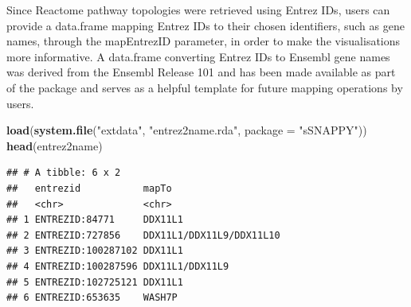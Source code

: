 \documentclass[9pt,a4paper,]{extarticle}
\newenvironment{Shaded}{\begin{snugshade}}{\end{snugshade}}
\newcommand{\AttributeTok}[1]{\textcolor[rgb]{0.13,0.29,0.53}{#1}}
\newcommand{\DecValTok}[1]{\textcolor[rgb]{0.00,0.00,0.81}{#1}}
\newcommand{\FunctionTok}[1]{\textcolor[rgb]{0.13,0.29,0.53}{\textbf{#1}}}
\newcommand{\NormalTok}[1]{#1}
\newcommand{\OtherTok}[1]{\textcolor[rgb]{0.56,0.35,0.01}{#1}}
\newcommand{\SpecialCharTok}[1]{\textcolor[rgb]{0.81,0.36,0.00}{\textbf{#1}}}
\newcommand{\StringTok}[1]{\textcolor[rgb]{0.31,0.60,0.02}{#1}}
\begin{document}
\begin{Shaded}
\end{Shaded}

Since Reactome pathway topologies were retrieved using Entrez IDs, users can provide a data.frame mapping Entrez IDs to their chosen identifiers, such as gene names, through the mapEntrezID parameter, in order to make the visualisations more informative.
A data.frame converting Entrez IDs to Ensembl gene names was derived from the Ensembl Release 101\citep{Ensembl2022} and has been made available as part of the package and serves as a helpful template for future mapping operations by users.

\begin{Shaded}
\begin{Highlighting}[]
\FunctionTok{load}\NormalTok{(}\FunctionTok{system.file}\NormalTok{(}\StringTok{"extdata"}\NormalTok{, }\StringTok{"entrez2name.rda"}\NormalTok{, }\AttributeTok{package =} \StringTok{"sSNAPPY"}\NormalTok{))}
\FunctionTok{head}\NormalTok{(entrez2name)}
\end{Highlighting}
\end{Shaded}

\begin{verbatim}
## # A tibble: 6 x 2
##   entrezid           mapTo                   
##   <chr>              <chr>                   
## 1 ENTREZID:84771     DDX11L1                 
## 2 ENTREZID:727856    DDX11L1/DDX11L9/DDX11L10
## 3 ENTREZID:100287102 DDX11L1                 
## 4 ENTREZID:100287596 DDX11L1/DDX11L9         
## 5 ENTREZID:102725121 DDX11L1                 
## 6 ENTREZID:653635    WASH7P
\end{verbatim}
\end{document}
